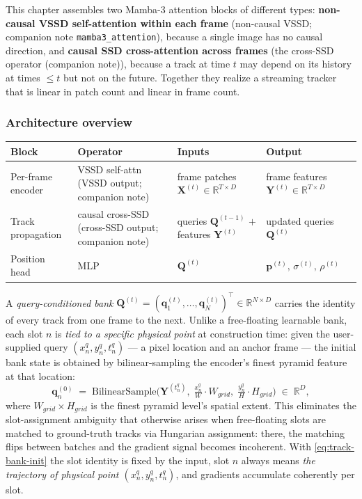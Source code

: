 \documentclass[11pt,a4paper]{article}
\begin{document}
This chapter assembles two Mamba-3 attention blocks of different types:
\textbf{non-causal VSSD self-attention within each frame} (non-causal VSSD; companion note \texttt{mamba3\_attention}),
because a single image has no causal direction, and
\textbf{causal SSD cross-attention across frames} (the cross-SSD operator (companion note)),
because a track at time $t$ may depend on its history at times
$\le t$ but not on the future. Together they realize a streaming
tracker that is linear in patch count and linear in frame count.

\subsubsection{Architecture overview}
\label{sec:track-arch}

\begin{center}\small
\setlength{\tabcolsep}{4pt}
\begin{tabular}{|p{2.3cm}|p{3.3cm}|p{4.4cm}|p{3.6cm}|}
\hline
\textbf{Block} & \textbf{Operator} & \textbf{Inputs} & \textbf{Output} \\ \hline
Per-frame encoder
  & VSSD self-attn (VSSD output; companion note)
  & frame patches $\bm{X}^{(t)}\in\mathbb{R}^{T\times D}$
  & frame features $\bm{Y}^{(t)}\in\mathbb{R}^{T\times D}$ \\ \hline
Track propagation
  & causal cross-SSD (cross-SSD output; companion note)
  & queries $\bm{Q}^{(t-1)}$ $+$ features $\bm{Y}^{(t)}$
  & updated queries $\bm{Q}^{(t)}$ \\ \hline
Position head
  & MLP
  & $\bm{Q}^{(t)}$
  & $\bm{p}^{(t)},\,\sigma^{(t)},\,\rho^{(t)}$ \\ \hline
\end{tabular}
\end{center}

A \emph{query-conditioned bank}
$\bm{Q}^{(t)} = (\bm{q}_1^{(t)},\dots,\bm{q}_N^{(t)})^\top
\in\mathbb{R}^{N\times D}$ carries the identity of every track from
one frame to the next. Unlike a free-floating learnable bank, each
slot $n$ is \emph{tied to a specific physical point} at construction
time: given the user-supplied query
$(x_n^{q}, y_n^{q}, t_n^{q})$ — a pixel location and an anchor frame
— the initial bank state is obtained by bilinear-sampling the
encoder's finest pyramid feature at that location:
\begin{equation}\label{eq:track-bank-init}
  \bm{q}_n^{(0)} \;=\; \mathrm{BilinearSample}\!\bigl(
    \bm{Y}^{(t_n^{q})},\; \tfrac{x_n^{q}}{W}\cdot W_{\!grid},\;
                          \tfrac{y_n^{q}}{H}\cdot H_{\!grid}\bigr)
  \;\in\; \mathbb{R}^{D},
\end{equation}
where $W_{\!grid}\times H_{\!grid}$ is the finest pyramid level's
spatial extent. This eliminates the slot-assignment ambiguity that
otherwise arises when free-floating slots are matched to ground-truth
tracks via Hungarian assignment: there, the matching flips between
batches and the gradient signal becomes incoherent. With
\eqref{eq:track-bank-init} the slot identity is fixed by the input,
slot $n$ always means \emph{the trajectory of physical point
$(x_n^{q}, y_n^{q}, t_n^{q})$}, and gradients accumulate coherently
per slot.
\end{document}
